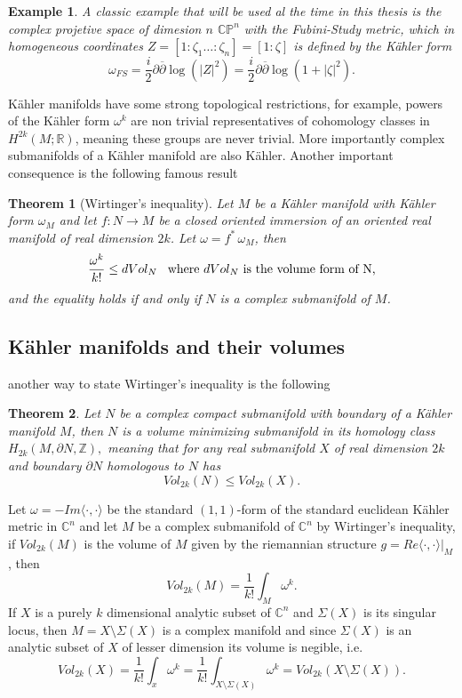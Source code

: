 \documentclass[letterpaper]{book}
\newtheorem{theorem}{Theorem}[section]
\newtheorem{example}{Example}
\newcommand{\zah}{\ensuremath{ \mathbb Z }}
\newcommand{\con}{\ensuremath{\mathbb{C}^n}}
\newcommand{\cp}{\ensuremath{\mathbb{CP}}}
\newcommand{\re}{\ensuremath{\mathbb R }}
\begin{document}
\begin{example}
  A classic example that will be used al the time in this thesis is the complex projetive space of dimesion $n$ $\cp^{n}$ with the Fubini-Study metric, which in homogeneous coordinates $Z=[1:\zeta_{1}\dots:\zeta_{n}]=[1:\zeta]$ is defined by the Kähler form
  \[
    \omega_{FS}=\frac{i}{2}\partial \overline{\partial}\log(|Z|^{2})=\frac{i}{2}\partial \overline{\partial}\log(1+|\zeta|^{2}).
  \]
\end{example}
Kähler manifolds have some strong topological restrictions, for example, powers of the Kähler form $\omega^k$ are non trivial representatives of cohomology classes in $H^{2k}(M ;\re)$, meaning these groups are never trivial. More importantly complex submanifolds of a Kähler manifold are also K\"ahler.
Another important consequence is the following famous result
\begin{theorem}[Wirtinger's inequality]
        Let $M$ be a Kähler manifold with Kähler form $\omega_M$ and let $f:N\rightarrow M$ be a closed oriented immersion
        of an oriented real manifold of real dimension $2k$. Let $\omega=f^*\,\omega_M$, then
        \begin{equation}
                        \frac{\omega^k}{k!}\leq dVol_N\hspace{0.3cm}\text{where }dVol_N\text{ is the volume form of N,}
        \end{equation}
        and the equality holds if and only if $N$ is a complex submanifold of $M$.
\end{theorem}
\subsection{Kähler manifolds and their volumes}
\noindent another way to state Wirtinger's inequality is the following
\begin{theorem}\label{wirtinger}
        Let $N$ be a complex compact submanifold with boundary of a Kähler manifold $M$, then $N$ is a volume minimizing
        submanifold in its homology class $H_{2k}(M,\partial N,\zah),$ meaning that for any real submanifold $X$ of
        real dimension $2k$ and boundary $\partial N$ homologous to $N$ has
        \[
          Vol_{2k}(N)\leq Vol_{2k}(X).
        \]
\end{theorem}
\noindent Let $\omega=-Im\langle\cdot,\cdot\rangle$ be the standard $(1,1)$-form of the standard euclidean Kähler metric in $\con$ and let $M$ be a complex submanifold of $\con$ by Wirtinger's inequality, if $Vol_{2k}(M)$ is the volume of $M$ given by the riemannian structure $g=Re\langle\cdot,\cdot\rangle\vert_{M}$, then
\begin{equation}
        Vol_{2k}(M)= \frac{1}{k!}\int_M \omega^k.
\end{equation}
If $X$ is a purely $k$ dimensional analytic subset of $\con$ and $\Sigma(X)$ is
its singular locus, then $M=X\setminus\Sigma(X)$ is a complex manifold and
since $\Sigma(X)$ is an analytic subset of $X$ of lesser dimension its volume is negible, i.e.
\[
    Vol_{2k}(X)= \frac{1}{k!}\int_{x} \omega^k=
                              \frac{1}{k!}\int_{X\setminus\Sigma(X)} \omega^k=
                                                            Vol_{2k}(X\setminus\Sigma(X)).
\]
\end{document}
